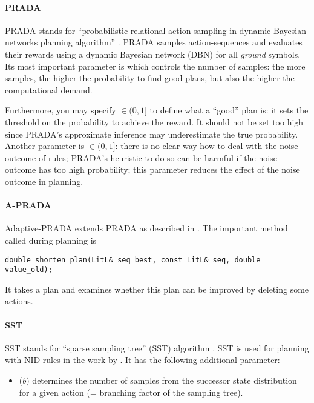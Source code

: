 \documentclass[10pt,twoside,twocolumn,fleqn]{article}
\begin{document}
\paragraph{PRADA}

PRADA stands for ``probabilistic relational action-sampling in dynamic
Bayesian networks planning algorithm'' \citep{lang-toussaint-10jair}.
PRADA samples action-sequences and evaluates their rewards using a dynamic
Bayesian network (DBN)  for all \emph{ground} symbols.
Its most important parameter is  which controls the
number of samples: the more samples, the higher the probability to find
good plans, but also the higher the computational demand.

Furthermore, you may specify  $\in (0,1]$ to define
what a ``good'' plan is: it sets the threshold on the probability to
achieve the reward. It should not be set too high since PRADA's
approximate inference may underestimate the true probability. Another
parameter is  $\in (0,1]$: there is no clear way
how to deal with the noise outcome of rules; PRADA's heuristic to do so
can be harmful if the noise outcome has too high probability; this
parameter reduces the effect of the noise outcome in planning.



\paragraph{A-PRADA}

Adaptive-PRADA extends PRADA as described in \cite{lang-toussaint-10jair}.
The important method called during planning is 
\begin{lstlisting}
double shorten_plan(LitL& seq_best, const LitL& seq, double value_old);
\end{lstlisting}
It takes a plan and examines whether this plan can be improved by deleting
some actions.


\paragraph{SST}

SST stands for ``sparse sampling tree'' (SST) algorithm
\citep{kearns02ss}. SST is used for planning with NID rules in the work by
\cite{pasula07ai}. It has the following additional parameter:
\begin{itemize}
\item {} ($b$) determines the number of samples from the
successor state distribution for a given action (= branching factor of
the sampling tree).
\end{itemize}
\end{document}
